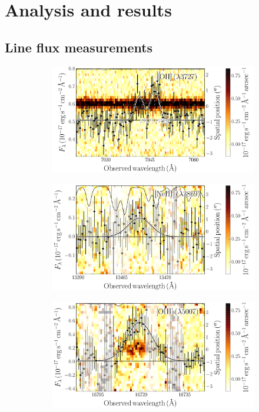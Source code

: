 \documentclass[traditabstract, longauth]{aa}
\begin{document}
\section{Analysis and results}

\subsection{Line flux measurements}

\begin{figure}
\begin{subfigure}{.33\textwidth}
  \includegraphics[width=0.999\linewidth]{Figs/Lines/GRB140506A_OII3726_vis_2d.pdf}
\end{subfigure}
\begin{subfigure}{.33\textwidth}
  \includegraphics[width=0.999\linewidth]{Figs/Lines/GRB100424A_NeIII3869_nir_2d.pdf}
\end{subfigure}
\begin{subfigure}{.33\textwidth}
  \includegraphics[width=0.999\linewidth]{Figs/Lines/GRB070129_OIII5007_nir_2d.pdf}

\end{subfigure}
\end{figure}
\end{document}
